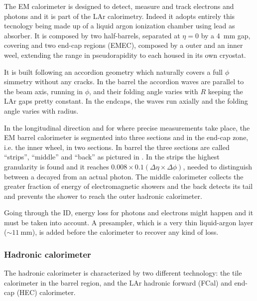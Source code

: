 The EM calorimeter is designed to detect, measure and track electrons and photons and it is part of the LAr calorimetry. Indeed it adopts entirely this tecnology being made up of a liquid argon ionization chamber using lead as absorber. It is composed by two half-barrels, separated at $\eta=0$ by a \SI{4}{\mm} gap, covering  and two end-cap regions (EMEC), composed by a outer and an inner weel, extending the range in pseudorapidity to  each housed in its own cryostat. 

It is built following an accordion geometry which naturally covers a full $\phi$ simmetry without any cracks. In the barrel the accordion waves are parallel to the beam axis, running in $\phi$, and their folding angle varies with $R$ keeping the LAr gaps pretty constant. In the endcaps, the waves run axially and the folding angle varies with radius.

In the longitudinal direction and for  where precise measurements take place, the EM barrel calorimeter is segmented into three sections and in the end-cap zone, i.e. the inner wheel, in two sections. In barrel the three sections are called ``strips'', ``middle'' and ``back'' as pictured in \Fig{\ref{fig:EMlayers}}. In the strips the highest granularity is found and it reaches \mbox{$0.008 \times 0.1 \left(\Delta \eta \times \Delta \phi \right)$}, needed to distinguish between a decayed \pizero from an actual photon. The middle calorimeter collects the greater fraction of energy of electromagnetic showers and the back detects its tail and prevents the shower to reach the outer hadronic calorimeter.
  
Going through the ID, energy loss for photons and electrons might happen and it must be taken into account. A presampler, which is a very thin liquid-argon layer ($\sim \SI{11}{\mm}$), is added before the calorimeter to recover any kind of loss.

\subsubsection{Hadronic calorimeter}
The hadronic calorimeter is characterized by two different technology: the tile calorimeter in the barrel region, and the LAr hadronic forward (FCal) and end-cap (HEC) calorimeter. 

